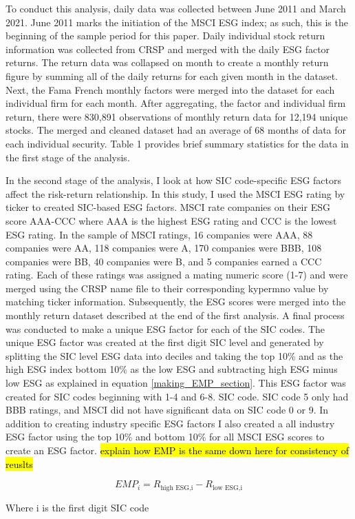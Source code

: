 To conduct this analysis, daily data was collected between June 2011 and March 2021.  June 2011 marks the initiation of the MSCI ESG index; as such, this is the beginning of the sample period for this paper. Daily individual stock return information was collected from CRSP and merged with the daily ESG factor returns. The return data was collapsed on month to create a monthly return figure by summing all of the daily returns for each given month in the dataset. Next, the Fama French monthly factors were merged into the dataset for each individual firm for each month. After aggregating, the factor and individual firm return, there were 830,891 observations of monthly return data for 12,194 unique stocks. The merged and cleaned dataset had an average of 68 months of data for each individual security. Table 1 provides brief summary statistics for the data in the first stage of the analysis.

In the second stage of the analysis, I look at how SIC code-specific ESG factors affect the risk-return relationship. In this study, I used the MSCI ESG rating by ticker to created SIC-based ESG factors. MSCI rate companies on their ESG score AAA-CCC where AAA is the highest ESG rating and CCC is the lowest ESG rating. In the sample of MSCI ratings, 16 companies were AAA, 88 companies were AA, 118 companies were A, 170 companies were BBB, 108 companies were BB, 40 companies were B, and 5 companies earned a CCC rating.  Each of these ratings was assigned a mating numeric score (1-7) and were merged using the CRSP name file to their corresponding kypermno value by matching ticker information. Subsequently, the ESG scores were merged into the monthly return dataset described at the end of the first analysis. A final process was conducted to make a unique ESG factor for each of the SIC codes. The unique ESG factor was created at the first digit SIC level and generated by splitting the SIC level ESG data into deciles and taking the top 10\% and as the high ESG index bottom 10\% as the low ESG and subtracting high ESG minus low ESG as explained in equation \eqref{making_EMP_section}. This ESG factor was created for SIC codes beginning with 1-4 and 6-8. SIC code. SIC code 5 only had BBB ratings, and MSCI did not have significant data on SIC code 0 or 9. In addition to creating industry specific ESG factors I also created a all industry ESG factor using the top 10\% and bottom 10\% for all MSCI ESG scores to create an ESG factor. \hl{explain how EMP is the same down here for consistency of reuslts}

\begin{equation}
    \label{making_EMP_section}
    EMP_i = R_{\text{high ESG,i}}- R_{\text{low ESG,i}}
\end{equation}

\begin{center}
    Where i is the first digit SIC code    
\end{center}



